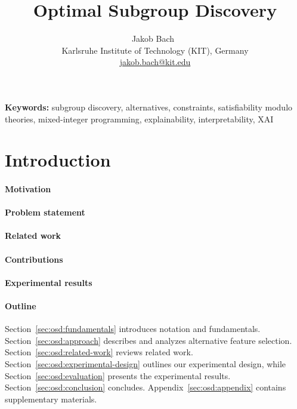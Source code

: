 \documentclass{article}
\title{
	Optimal Subgroup Discovery
}
\author{
	Jakob Bach~\orcidlink{0000-0003-0301-2798}\\
	\small Karlsruhe Institute of Technology (KIT), Germany\\
	\small \href{mailto:jakob.bach@kit.edu}{jakob.bach@kit.edu}
}
\date{} %
\theoremstyle{definition}
\begin{document}
\maketitle

\begin{abstract}
\end{abstract}
%
\textbf{Keywords:} subgroup discovery, alternatives, constraints, satisfiability modulo theories, mixed-integer programming, explainability, interpretability, XAI

\section{Introduction}
\label{sec:osd:introduction}

\paragraph{Motivation}

\cite{carvalho2019machine} \cite{molnar2020interpretable}

\paragraph{Problem statement}

\paragraph{Related work}

\paragraph{Contributions}

\paragraph{Experimental results}

\paragraph{Outline}

Section~\ref{sec:osd:fundamentals} introduces notation and fundamentals.
Section~\ref{sec:osd:approach} describes and analyzes alternative feature selection.
Section~\ref{sec:osd:related-work} reviews related work.
Section~\ref{sec:osd:experimental-design} outlines our experimental design, while Section~\ref{sec:osd:evaluation} presents the experimental results.
Section~\ref{sec:osd:conclusion} concludes.
Appendix~\ref{sec:osd:appendix} contains supplementary materials.
\end{document}
